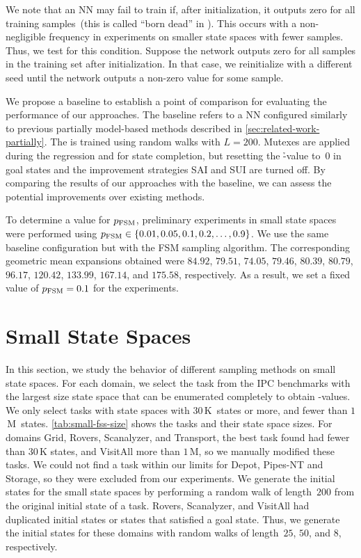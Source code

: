 We note that an NN may fail to train if, after initialization, it outputs zero for all training samples~(this is called ``born dead'' in \citet{lu2020dying}). This occurs with a non-negligible frequency in experiments on smaller state spaces with fewer samples. Thus, we test for this condition. Suppose the network outputs zero for all samples in the training set after initialization. In that case, we reinitialize with a different seed until the network outputs a non-zero value for some sample.

We propose a baseline \hnnbase to establish a point of comparison for evaluating the performance of our approaches. The baseline refers to a NN configured similarly to previous partially model-based methods described in \cref{sec:related-work-partially}. The \hnnbase is trained using random walks with $L=200$. Mutexes are applied during the regression and for state completion, but resetting the \h-value to~$0$ in goal states and the improvement strategies SAI and SUI are turned off. By comparing the results of our approaches with the baseline, we can assess the potential improvements over existing methods.

To determine a value for $p_{\text{FSM}}$, preliminary experiments in small state spaces were performed using $p_{\text{FSM}}\in\{0.01,0.05,0.1,0.2,\ldots,0.9\}$. We use the same baseline configuration but with the FSM sampling algorithm. The corresponding geometric mean expansions obtained were $84.92$, $79.51$, $74.05$, $79.46$, $80.39$, $80.79$, $96.17$, $120.42$, $133.99$, $167.14$, and $175.58$, respectively. As a result, we set a fixed value of $p_{\text{FSM}} = 0.1$ for the experiments.

\section{Small State Spaces}
\label{sec:small-experiments}

In this section, we study the behavior of different sampling methods on small state spaces. For each domain, we select the task from the IPC benchmarks with the largest size state space that can be enumerated completely to obtain \hstar-values. We only select tasks with state spaces with $30$\,K~states or more, and fewer than $1$\,M~states. \cref{tab:small-fss-size} shows the tasks and their state space sizes. For domains Grid, Rovers, Scanalyzer, and Transport, the best task found had fewer than $30$\,K states, and VisitAll more than $1$\,M, so we manually modified these tasks. We could not find a task within our limits for Depot, Pipes-NT and Storage, so they were excluded from our experiments. We generate the initial states for the small state spaces by performing a random walk of length~$200$ from the original initial state of a task. Rovers, Scanalyzer, and VisitAll had duplicated initial states or states that satisfied a goal state. Thus, we generate the initial states for these domains with random walks of length~$25$, $50$, and $8$, respectively.

